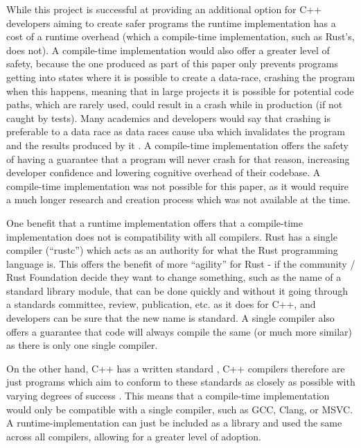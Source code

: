 \documentclass[a4paper]{article}
\begin{document}
While this project is successful at providing an additional option for C++ developers aiming to create safer programs the runtime implementation has a cost of a runtime overhead (which a compile-time implementation, such as Rust's, does not). A compile-time implementation would also offer a greater level of safety, because the one produced as part of this paper only prevents programs getting into states where it is possible to create a data-race, crashing the program when this happens, meaning that in large projects it is possible for potential code paths, which are rarely used, could result in a crash while in production (if not caught by tests). Many academics and developers would say that crashing is preferable to a data race as data races cause \gls{uba} which invalidates the program and the results produced by it \parencite{cpp-reference-ub}. A compile-time implementation offers the safety of having a guarantee that a program will never crash for that reason, increasing developer confidence and lowering cognitive overhead of their codebase. A compile-time implementation was not possible for this paper, as it would require a much longer research and creation process which was not available at the time.

One benefit that a runtime implementation offers that a compile-time implementation does not is compatibility with all compilers. Rust has a single compiler (``rustc'') which acts as an authority for what the Rust programming language is. This offers the benefit of more ``agility'' for Rust - if the community / Rust Foundation decide they want to change something, such as the name of a standard library module, that can be done quickly and without it going through a standards committee, review, publication, etc. as it does for C++, and developers can be sure that the new name is standard. A single compiler also offers a guarantee that code will always compile the same (or much more similar) as there is only one single compiler.

On the other hand, C++ has a written standard \parencite{cpp-standard}, C++ compilers therefore are just programs which aim to conform to these standards as closely as possible with varying degrees of success \parencite{cpp-standard-conformity}. This means that a compile-time implementation would only be compatible with a single compiler, such as GCC, Clang, or MSVC. A runtime-implementation can just be included as a library and used the same across all compilers, allowing for a greater level of adoption.
\end{document}
